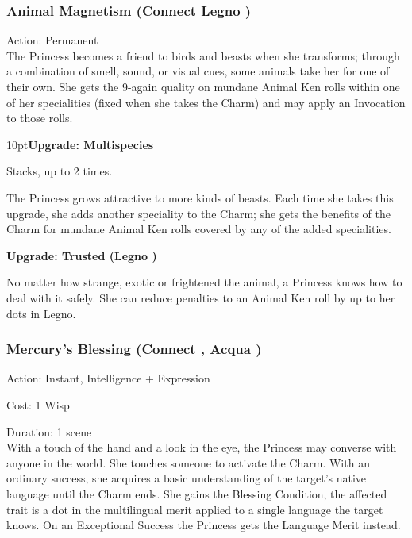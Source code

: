 \subsubsection*{Animal Magnetism (Connect \textbullet Legno \textbullet)}

\noindent Action: Permanent\\

\noindent The Princess becomes a friend to birds and beasts when she transforms; through a combination of smell, sound, or visual cues, some animals take her for one of their own. She gets the 9-again quality on mundane Animal Ken rolls within one of her specialities (fixed when she takes the Charm) and may apply an Invocation to those rolls.

\begin{myindentpar}{10pt}\textbf{Upgrade: Multispecies}

Stacks, up to 2 times.

The Princess grows attractive to more kinds of beasts. Each time she takes this upgrade, she adds another speciality to the Charm; she gets the benefits of the Charm for mundane Animal Ken rolls covered by any of the added specialities.

\textbf{Upgrade: Trusted (Legno \textbullet\textbullet)}

No matter how strange, exotic or frightened the animal, a Princess knows how to deal with it safely. She can reduce penalties to an Animal Ken roll by up to her dots in Legno. \end{myindentpar}

\subsubsection*{Mercury's Blessing (Connect \textbullet, Acqua \textbullet)}

\noindent Action: Instant, Intelligence + Expression

\noindent Cost: 1 Wisp

\noindent Duration: 1 scene \\

\noindent With a touch of the hand and a look in the eye, the Princess may converse with anyone in the world. She touches someone to activate the Charm. With an ordinary success, she acquires a basic understanding of the target's native language until the Charm ends. She gains the Blessing Condition, the affected trait is a dot in the multilingual merit applied to a single language the target knows. On an Exceptional Success the Princess gets the Language Merit instead. 

